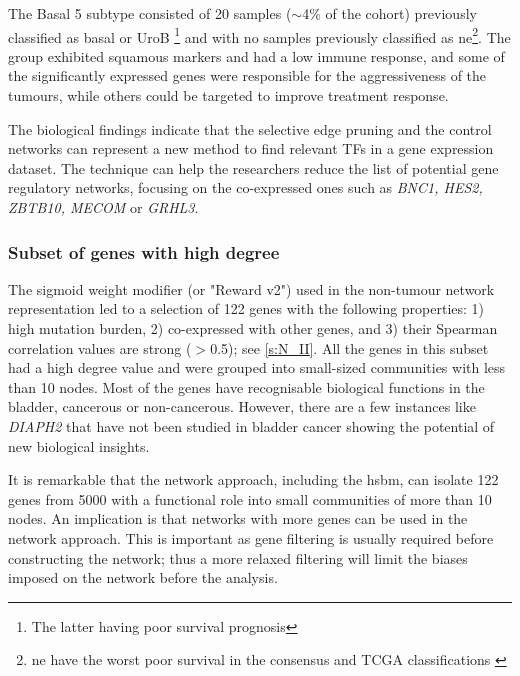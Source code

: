 The Basal 5 subtype consisted of 20 samples ($\sim$4\% of the cohort) previously classified as basal \citep{Kamoun2020-tj,Robertson2017-mg} or UroB \citep{Marzouka2018-ge}\footnote{The latter having poor survival prognosis} and with no samples previously classified as \acrlong{ne}\footnote{\acrlong{ne} have the worst poor survival in the consensus and TCGA classifications \citep{Kamoun2020-tj,Robertson2017-mg}}. The group exhibited squamous markers and had a low immune response, and some of the significantly expressed genes were responsible for the aggressiveness of the tumours, while others could be targeted to improve treatment response.

The biological findings indicate that the selective edge pruning and the control networks can represent a new method to find relevant \gls{TF}s in a gene expression dataset. The technique can help the researchers reduce the list of potential gene regulatory networks, focusing on the co-expressed ones such as \textit{BNC1, HES2, ZBTB10, MECOM} or \textit{GRHL3}.

\subsubsection*{Subset of genes with high degree}

The sigmoid weight modifier (or "Reward v2") used in the non-tumour network representation led to a selection of 122 genes with the following properties: 1) high mutation burden, 2) co-expressed with other genes, and 3) their Spearman correlation values are strong (\(>\)0.5); see \cref{s:N_II}. All the genes in this subset had a high degree value and were grouped into small-sized communities with less than 10 nodes. Most of the genes have recognisable biological functions in the bladder, cancerous or non-cancerous. However, there are a few instances like \textit{DIAPH2} that have not been studied in bladder cancer showing the potential of new biological insights.

It is remarkable that the network approach, including the \acrshort{hsbm}, can isolate 122 genes from 5000 with a functional role into small communities of more than 10 nodes. An implication is that networks with more genes can be used in the network approach. This is important as gene filtering is usually required before constructing the network; thus a more relaxed filtering will limit the biases imposed on the network before the analysis.

